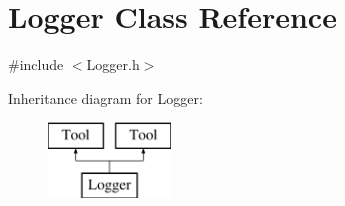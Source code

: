 \hypertarget{classLogger}{\section{Logger Class Reference}
\label{classLogger}
}


{\ttfamily \#include $<$Logger.\-h$>$}

Inheritance diagram for Logger\-:\begin{figure}[H]
\begin{center}
\leavevmode
\includegraphics[height=2.000000cm]{classLogger}
\end{center}
\end{figure}
